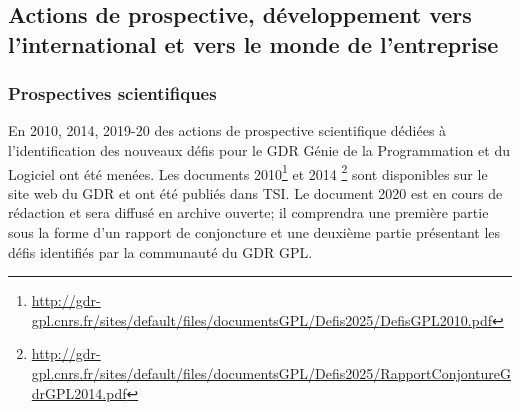 \documentclass[11pt]{article}
\begin{document}





\subsection{Actions de prospective, développement vers l'international  et vers le monde de l'entreprise}


\subsubsection{Prospectives scientifiques}
En 2010, 2014, 2019-20 des actions de prospective scientifique dédiées à
l'identification des nouveaux défis pour le GDR Génie de la Programmation et du
Logiciel ont été menées. Les documents 2010\footnote{\url{http://gdr-gpl.cnrs.fr/sites/default/files/documentsGPL/Defis2025/DefisGPL2010.pdf}} et 2014 \footnote{\url{http://gdr-gpl.cnrs.fr/sites/default/files/documentsGPL/Defis2025/RapportConjontureGdrGPL2014.pdf}} sont disponibles sur le site web du GDR et ont été publiés dans TSI.
Le document 2020 est en cours de rédaction et sera
diffusé en archive ouverte; il comprendra une première partie sous la forme d'un rapport de	conjoncture et une deuxième partie présentant les défis identifiés par la communauté du GDR GPL. \\
\end{document}
